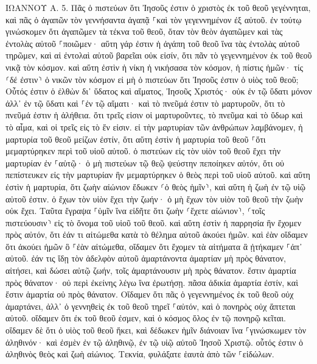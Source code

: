 \documentclass[twoside, 9pt]{extreport}
\begin{document}
ΙΩΑΝΝΟΥ Α.
5.
Πᾶς ὁ πιστεύων ὅτι Ἰησοῦς ἐστιν ὁ χριστὸς ἐκ τοῦ θεοῦ γεγέννηται, καὶ πᾶς ὁ ἀγαπῶν τὸν γεννήσαντα ἀγαπᾷ ⸀καὶ τὸν γεγεννημένον ἐξ αὐτοῦ. 
ἐν τούτῳ γινώσκομεν ὅτι ἀγαπῶμεν τὰ τέκνα τοῦ θεοῦ, ὅταν τὸν θεὸν ἀγαπῶμεν καὶ τὰς ἐντολὰς αὐτοῦ ⸀ποιῶμεν· 
αὕτη γάρ ἐστιν ἡ ἀγάπη τοῦ θεοῦ ἵνα τὰς ἐντολὰς αὐτοῦ τηρῶμεν, καὶ αἱ ἐντολαὶ αὐτοῦ βαρεῖαι οὐκ εἰσίν, 
ὅτι πᾶν τὸ γεγεννημένον ἐκ τοῦ θεοῦ νικᾷ τὸν κόσμον. καὶ αὕτη ἐστὶν ἡ νίκη ἡ νικήσασα τὸν κόσμον, ἡ πίστις ἡμῶν· 
τίς ⸂δέ ἐστιν⸃ ὁ νικῶν τὸν κόσμον εἰ μὴ ὁ πιστεύων ὅτι Ἰησοῦς ἐστιν ὁ υἱὸς τοῦ θεοῦ; 
Οὗτός ἐστιν ὁ ἐλθὼν δι᾽ ὕδατος καὶ αἵματος, Ἰησοῦς Χριστός· οὐκ ἐν τῷ ὕδατι μόνον ἀλλ᾽ ἐν τῷ ὕδατι καὶ ⸀ἐν τῷ αἵματι· καὶ τὸ πνεῦμά ἐστιν τὸ μαρτυροῦν, ὅτι τὸ πνεῦμά ἐστιν ἡ ἀλήθεια. 
ὅτι τρεῖς εἰσιν οἱ μαρτυροῦντες, 
τὸ πνεῦμα καὶ τὸ ὕδωρ καὶ τὸ αἷμα, καὶ οἱ τρεῖς εἰς τὸ ἕν εἰσιν. 
εἰ τὴν μαρτυρίαν τῶν ἀνθρώπων λαμβάνομεν, ἡ μαρτυρία τοῦ θεοῦ μείζων ἐστίν, ὅτι αὕτη ἐστὶν ἡ μαρτυρία τοῦ θεοῦ ⸀ὅτι μεμαρτύρηκεν περὶ τοῦ υἱοῦ αὐτοῦ. 
ὁ πιστεύων εἰς τὸν υἱὸν τοῦ θεοῦ ἔχει τὴν μαρτυρίαν ἐν ⸀αὑτῷ· ὁ μὴ πιστεύων τῷ θεῷ ψεύστην πεποίηκεν αὐτόν, ὅτι οὐ πεπίστευκεν εἰς τὴν μαρτυρίαν ἣν μεμαρτύρηκεν ὁ θεὸς περὶ τοῦ υἱοῦ αὐτοῦ. 
καὶ αὕτη ἐστὶν ἡ μαρτυρία, ὅτι ζωὴν αἰώνιον ἔδωκεν ⸂ὁ θεὸς ἡμῖν⸃, καὶ αὕτη ἡ ζωὴ ἐν τῷ υἱῷ αὐτοῦ ἐστιν. 
ὁ ἔχων τὸν υἱὸν ἔχει τὴν ζωήν· ὁ μὴ ἔχων τὸν υἱὸν τοῦ θεοῦ τὴν ζωὴν οὐκ ἔχει. 
Ταῦτα ἔγραψα ⸀ὑμῖν ἵνα εἰδῆτε ὅτι ζωὴν ⸂ἔχετε αἰώνιον⸃, ⸂τοῖς πιστεύουσιν⸃ εἰς τὸ ὄνομα τοῦ υἱοῦ τοῦ θεοῦ. 
καὶ αὕτη ἐστὶν ἡ παρρησία ἣν ἔχομεν πρὸς αὐτόν, ὅτι ἐάν τι αἰτώμεθα κατὰ τὸ θέλημα αὐτοῦ ἀκούει ἡμῶν. 
καὶ ἐὰν οἴδαμεν ὅτι ἀκούει ἡμῶν ὃ ⸀ἐὰν αἰτώμεθα, οἴδαμεν ὅτι ἔχομεν τὰ αἰτήματα ἃ ᾐτήκαμεν ⸀ἀπ᾽ αὐτοῦ. 
ἐάν τις ἴδῃ τὸν ἀδελφὸν αὐτοῦ ἁμαρτάνοντα ἁμαρτίαν μὴ πρὸς θάνατον, αἰτήσει, καὶ δώσει αὐτῷ ζωήν, τοῖς ἁμαρτάνουσιν μὴ πρὸς θάνατον. ἔστιν ἁμαρτία πρὸς θάνατον· οὐ περὶ ἐκείνης λέγω ἵνα ἐρωτήσῃ. 
πᾶσα ἀδικία ἁμαρτία ἐστίν, καὶ ἔστιν ἁμαρτία οὐ πρὸς θάνατον. 
Οἴδαμεν ὅτι πᾶς ὁ γεγεννημένος ἐκ τοῦ θεοῦ οὐχ ἁμαρτάνει, ἀλλ᾽ ὁ γεννηθεὶς ἐκ τοῦ θεοῦ τηρεῖ ⸀αὐτόν, καὶ ὁ πονηρὸς οὐχ ἅπτεται αὐτοῦ. 
οἴδαμεν ὅτι ἐκ τοῦ θεοῦ ἐσμεν, καὶ ὁ κόσμος ὅλος ἐν τῷ πονηρῷ κεῖται. 
οἴδαμεν δὲ ὅτι ὁ υἱὸς τοῦ θεοῦ ἥκει, καὶ δέδωκεν ἡμῖν διάνοιαν ἵνα ⸀γινώσκωμεν τὸν ἀληθινόν· καὶ ἐσμὲν ἐν τῷ ἀληθινῷ, ἐν τῷ υἱῷ αὐτοῦ Ἰησοῦ Χριστῷ. οὗτός ἐστιν ὁ ἀληθινὸς θεὸς καὶ ζωὴ αἰώνιος. 
Τεκνία, φυλάξατε ἑαυτὰ ἀπὸ τῶν ⸀εἰδώλων. 
\end{document}
